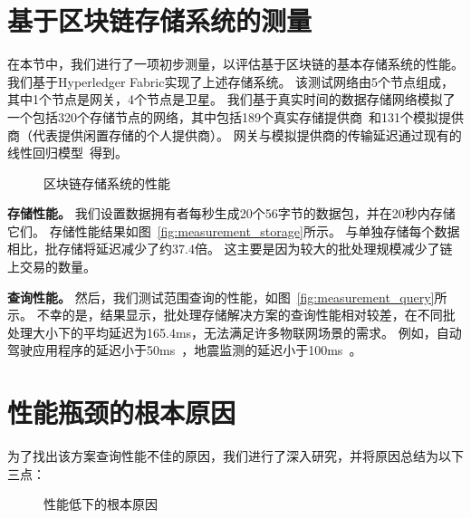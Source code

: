 \section{基于区块链存储系统的测量}
在本节中，我们进行了一项初步测量，以评估基于区块链的基本存储系统的性能。
我们基于Hyperledger Fabric实现了上述存储系统。
该测试网络由5个节点组成，其中1个节点是网关，4个节点是卫星。
我们基于真实时间的数据存储网络模拟了一个包括320个存储节点的网络，其中包括189个真实存储提供商~\cite{corneo2021surrounded}和131个模拟提供商（代表提供闲置存储的个人提供商）。
网关与模拟提供商的传输延迟通过现有的线性回归模型~\cite{ziviani2005improving}得到。
\begin{figure*}[t]
    \centering
    \begin{minipage}{0.85\linewidth}
	    \centering
        \hfill
        \caption{区块链存储系统的性能} 
    \end{minipage}
\end{figure*}

\textbf{存储性能。}
我们设置数据拥有者每秒生成20个56字节的数据包，并在20秒内存储它们。
存储性能结果如图~\autoref{fig:measurement_storage}所示。
与单独存储每个数据相比，批存储将延迟减少了约37.4倍。
这主要是因为较大的批处理规模减少了链上交易的数量。

\textbf{查询性能。}
然后，我们测试范围查询的性能，如图~\autoref{fig:measurement_query}所示。
不幸的是，结果显示，批处理存储解决方案的查询性能相对较差，在不同批处理大小下的平均延迟为165.4ms，无法满足许多物联网场景的需求。
例如，自动驾驶应用程序的延迟小于50ms~\cite{caesar2020nuscenes}，地震监测的延迟小于100ms~\cite{bhatia2023artificial}。

\section{性能瓶颈的根本原因}
为了找出该方案查询性能不佳的原因，我们进行了深入研究，并将原因总结为以下三点：

\begin{figure*}[t]
    \centering
    \begin{minipage}{0.8\linewidth}
	    \centering
        \hfill
        \hfill
        \caption{性能低下的根本原因} 
    \end{minipage}
\end{figure*}

